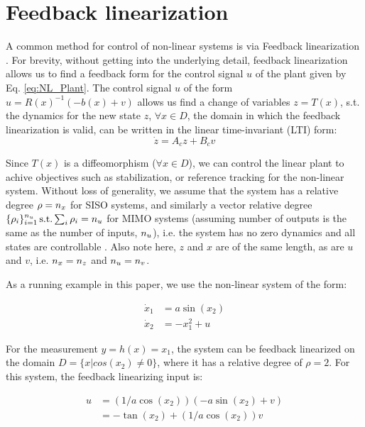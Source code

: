 \section{Feedback linearization}
\label{sec:feedbacklin}
A common method for control of non-linear systems is via Feedback linearization \cite{khalil}. For brevity, without getting into the underlying detail, feedback linearization allows us to find a feedback form for the control signal $u$ of the plant given by Eq. \ref{eq:NL_Plant}. The control signal $u$ of the form $u = R(x)^{-1}(-b(x)+v)$ allows us find a change of variables $z=T(x)$, s.t. the dynamics for the new state $z$, $\forall x \in D$, the domain in which the feedback linearization is valid, can be written in the linear time-invariant (LTI) form:
\begin{equation}
\label{eq:LTI_fb_lin}
\dot{z} = A_cz + B_cv
\end{equation}

Since $T(x)$ is a diffeomorphism ($\forall x \in D$), we can control the linear plant to achive objectives such as stabilization, or reference tracking for the non-linear system. Without loss of generality, we assume that the system has a relative degree $\rho=n_x$ for SISO systems, and similarly a vector relative degree $\lbrace \rho_i \rbrace_{i=1}^{n_u}\, \text{s.t.} \sum_i \rho_i = n_u$ for MIMO systems (assuming number of outputs is the same as the number of inputs, $n_u$), i.e. the system has no zero dynamics and all states are controllable \cite{khalil}. Also note here, $z$ and $x$ are of the same length, as are $u$ and $v$, i.e. $n_x = n_z$ and $n_u = n_v$.


 As a running example in this paper, we use the non-linear system of the form:

\begin{subequations}
\label{eq:toy_dynamics}
\begin{align}
\dot{x}_1 &= a\sin(x_2) \\
\dot{x}_2 &=-x_1^2 + u 
\end{align}
\end{subequations}

For the measurement $y = h(x) = x_1$, the system can be feedback linearized on the domain $D = \lbrace x | cos(x_2) \neq 0 \rbrace $, where it has a relative degree of $\rho=2$. For this system, the feedback linearizing input is:

\begin{subequations}
\begin{align}
u &= (1/a\cos(x_2))(-a\sin(x_2)+v) \nonumber \\
&= -\tan(x_2) + (1/a\cos(x_2))v
\end{align}
\end{subequations}

